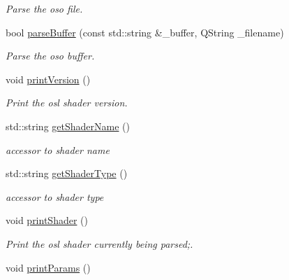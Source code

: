 \begin{DoxyCompactItemize}
\begin{DoxyCompactList}\small\item\em Parse the oso file. \end{DoxyCompactList}\item 
\hypertarget{class_oso_reader_a6858caaf259dee3078c92aba1749cce5}{bool \hyperlink{class_oso_reader_a6858caaf259dee3078c92aba1749cce5}{parse\-Buffer} (const std\-::string \&\-\_\-buffer, Q\-String \-\_\-filename)}\label{class_oso_reader_a6858caaf259dee3078c92aba1749cce5}

\begin{DoxyCompactList}\small\item\em Parse the oso buffer. \end{DoxyCompactList}\item 
\hypertarget{class_oso_reader_aee84bc1da468283d18f33fef025b4172}{void \hyperlink{class_oso_reader_aee84bc1da468283d18f33fef025b4172}{print\-Version} ()}\label{class_oso_reader_aee84bc1da468283d18f33fef025b4172}

\begin{DoxyCompactList}\small\item\em Print the osl shader version. \end{DoxyCompactList}\item 
\hypertarget{class_oso_reader_aeb9f3728a8f71686e2f98905bf6a850b}{std\-::string \hyperlink{class_oso_reader_aeb9f3728a8f71686e2f98905bf6a850b}{get\-Shader\-Name} ()}\label{class_oso_reader_aeb9f3728a8f71686e2f98905bf6a850b}

\begin{DoxyCompactList}\small\item\em accessor to shader name \end{DoxyCompactList}\item 
\hypertarget{class_oso_reader_a03886b44f396fea6f5342c3b37476f19}{std\-::string \hyperlink{class_oso_reader_a03886b44f396fea6f5342c3b37476f19}{get\-Shader\-Type} ()}\label{class_oso_reader_a03886b44f396fea6f5342c3b37476f19}

\begin{DoxyCompactList}\small\item\em accessor to shader type \end{DoxyCompactList}\item 
\hypertarget{class_oso_reader_ab2cbe5e100ae52e68537057c69d4faba}{void \hyperlink{class_oso_reader_ab2cbe5e100ae52e68537057c69d4faba}{print\-Shader} ()}\label{class_oso_reader_ab2cbe5e100ae52e68537057c69d4faba}

\begin{DoxyCompactList}\small\item\em Print the osl shader currently being parsed;. \end{DoxyCompactList}\item 
\hypertarget{class_oso_reader_ae0629d78ffeb6111cb72c8354074e8d4}{void \hyperlink{class_oso_reader_ae0629d78ffeb6111cb72c8354074e8d4}{print\-Params} ()}\label{class_oso_reader_ae0629d78ffeb6111cb72c8354074e8d4}


\end{DoxyCompactItemize}
